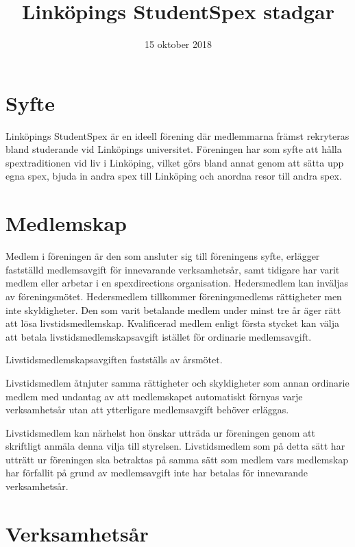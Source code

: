 \documentclass[a4paper]{article}
\title{Linköpings StudentSpex stadgar}
\author{}
\date{15 oktober 2018}
\begin{document}
\maketitle

\section{Syfte}
Linköpings StudentSpex är en ideell förening där medlemmarna främst rekryteras bland studerande vid Linköpings universitet. Föreningen har som syfte att hålla spextraditionen vid liv i Linköping, vilket görs bland annat genom att sätta upp egna spex, bjuda in andra spex till Linköping och anordna resor till andra spex.

\section{Medlemskap}
Medlem i föreningen är den som ansluter sig till föreningens syfte, erlägger fastställd medlemsavgift för innevarande verksamhetsår, samt tidigare har varit medlem eller arbetar i en spexdirections organisation.\newline
\newline
Hedersmedlem kan inväljas av föreningsmötet. Hedersmedlem tillkommer föreningsmedlems rättigheter men inte skyldigheter.\newline
\newline
Den som varit betalande medlem under minst tre år äger rätt att lösa livstidsmedlemskap. Kvalificerad medlem enligt första stycket kan välja att betala livstidsmedlemskapsavgift istället för ordinarie medlemsavgift. 

Livstidsmedlemskapsavgiften fastställs av årsmötet.

Livstidsmedlem åtnjuter samma rättigheter och skyldigheter som annan ordinarie medlem med undantag av att medlemskapet automatiskt förnyas varje verksamhetsår utan att ytterligare medlemsavgift behöver erläggas.

Livstidsmedlem kan närhelst hon önskar utträda ur föreningen genom att skriftligt anmäla denna vilja till styrelsen. Livstidsmedlem som på detta sätt har utträtt ur föreningen ska betraktas på samma sätt som medlem vars medlemskap har förfallit på grund av medlemsavgift inte har betalas för innevarande verksamhetsår.

\section{Verksamhetsår}
\end{document}
